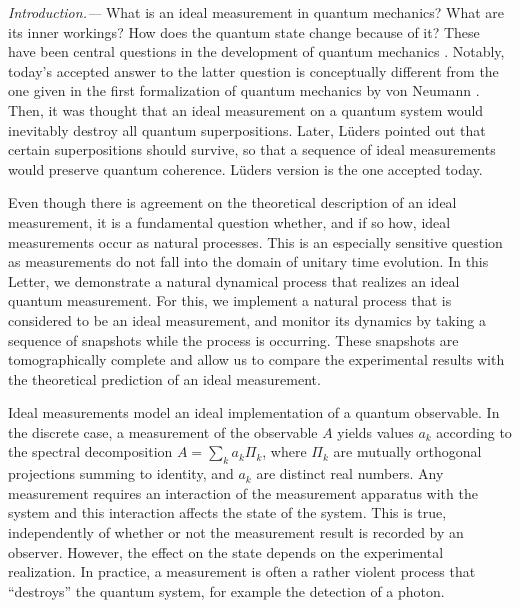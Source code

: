 \documentclass[
aps,prl,
reprint,
a4paper,
superscriptaddress,
floatfix,
]{revtex4-1}
\begin{document}
\maketitle

{\em Introduction.---}%
What is an ideal measurement in quantum mechanics?
What are its inner workings?
How does the quantum state change because of it?
These have been central questions in the development of quantum mechanics 
 \cite{WZ83}.
Notably, today's accepted answer to the latter question is conceptually 
 different from the one given in the first formalization of quantum mechanics 
 by von Neumann \cite{vonNeumann32}.
Then, it was thought that an ideal measurement on a quantum system would 
 inevitably destroy all quantum superpositions.
Later, Lüders pointed out \cite{Luders51} that certain superpositions should 
 survive, so that a sequence of ideal measurements would preserve quantum 
 coherence.
Lüders version is the one accepted today.

Even though there is agreement on the theoretical description of an ideal 
 measurement, it is a fundamental question whether, and if so how, ideal 
 measurements occur as natural processes.
This is an especially sensitive question as measurements do not fall into the 
 domain of unitary time evolution.
In this Letter, we demonstrate a natural dynamical process that realizes an 
 ideal quantum measurement.
For this, we implement a natural process that is considered to be an ideal 
 measurement, and monitor its dynamics by taking a sequence of snapshots while 
 the process is occurring.
These snapshots are tomographically complete and allow us to compare the 
 experimental results with the theoretical prediction of an ideal measurement.
 
Ideal measurements model an ideal implementation of a quantum observable.
In the discrete case, a measurement of the observable $A$ yields values $a_k$ 
 according to the spectral decomposition $A= \sum_k a_k \Pi_k$, where $\Pi_k$ 
 are mutually orthogonal projections summing to identity, and $a_k$ are distinct real 
 numbers.
Any measurement requires an interaction of the measurement apparatus with the 
 system and this interaction affects the state of the system.
This is true, independently of whether or not the measurement result is 
 recorded by an observer.
However, the effect on the state depends on the experimental realization.
In practice, a measurement is often a rather violent process that ``destroys'' 
 the quantum system, for example the detection of a photon. 
\end{document}
